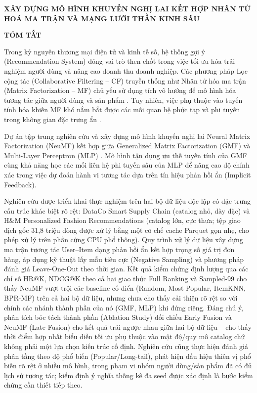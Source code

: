 \newpage
\begin{center}
{\fontsize{15pt}{18pt}\selectfont \textbf{XÂY DỰNG MÔ HÌNH KHUYẾN NGHỊ LAI KẾT HỢP NHÂN TỬ HOÁ MA TRẬN VÀ MẠNG LƯỚI THẦN KINH SÂU}\par}
\vspace{0.5cm}
{\fontsize{16pt}{19.2pt}\selectfont \textbf{TÓM TẮT}\par}
\end{center}
\vspace{0.2cm}

Trong kỷ nguyên thương mại điện tử và kinh tế số, hệ thống gợi ý (Recommendation System) đóng vai trò then chốt trong việc tối ưu hóa trải nghiệm người dùng và nâng cao doanh thu doanh nghiệp. Các phương pháp Lọc cộng tác (Collaborative Filtering -- CF) truyền thống như Nhân tử hóa ma trận (Matrix Factorization -- MF) chủ yếu sử dụng tích vô hướng để mô hình hóa tương tác giữa người dùng và sản phẩm \parencite{koren2009matrix}. Tuy nhiên, việc phụ thuộc vào tuyến tính hóa khiến MF khó nắm bắt được các mối quan hệ phức tạp và phi tuyến trong không gian đặc trưng ẩn \parencite{he2017ncf}.

Dự án tập trung nghiên cứu và xây dựng mô hình khuyến nghị lai Neural Matrix Factorization (NeuMF) kết hợp giữa Generalized Matrix Factorization (GMF) và Multi-Layer Perceptron (MLP) \parencite{he2017ncf}. Mô hình tận dụng ưu thế tuyến tính của GMF cùng khả năng học các mối liên hệ phi tuyến sâu của MLP để nâng cao độ chính xác trong việc dự đoán hành vi tương tác dựa trên tín hiệu phản hồi ẩn (Implicit Feedback).

Nghiên cứu được triển khai thực nghiệm trên hai bộ dữ liệu độc lập có đặc trưng cấu trúc khác biệt rõ rệt: DataCo Smart Supply Chain \parencite{dataco2019} (catalog nhỏ, dày đặc) và H\&M Personalized Fashion Recommendations (catalog lớn, cực thưa; tệp giao dịch gốc 31,8 triệu dòng được xử lý bằng một cơ chế cache Parquet gọn nhẹ, cho phép xử lý trên phần cứng CPU phổ thông). Quy trình xử lý dữ liệu xây dựng ma trận tương tác User--Item dạng phản hồi ẩn kết hợp trọng số giá trị đơn hàng, áp dụng kỹ thuật lấy mẫu tiêu cực (Negative Sampling) và phương pháp đánh giá Leave-One-Out theo thời gian. Kết quả kiểm chứng định lượng qua các chỉ số HR@K, NDCG@K \parencite{jarvelin2002} theo cả hai giao thức Full Ranking và Sampled-99 cho thấy NeuMF vượt trội các baseline cổ điển (Random, Most Popular, ItemKNN, BPR-MF) trên cả hai bộ dữ liệu, nhưng chưa cho thấy cải thiện rõ rệt so với chính các nhánh thành phần của nó (GMF, MLP) khi đứng riêng. Đáng chú ý, phân tích bóc tách thành phần (Ablation Study) đối chiếu Early Fusion và NeuMF (Late Fusion) cho kết quả trái ngược nhau giữa hai bộ dữ liệu -- cho thấy thời điểm hợp nhất biểu diễn tối ưu phụ thuộc vào mật độ/quy mô catalog chứ không phải một lựa chọn kiến trúc cố định. Nghiên cứu cũng thực hiện đánh giá phân tầng theo độ phổ biến (Popular/Long-tail), phát hiện dấu hiệu thiên vị phổ biến rõ rệt ở nhiều mô hình, trong phạm vi nhóm người dùng/sản phẩm đã có đủ lịch sử tương tác; kiểm định ý nghĩa thống kê đa seed được xác định là bước kiểm chứng cần thiết tiếp theo.